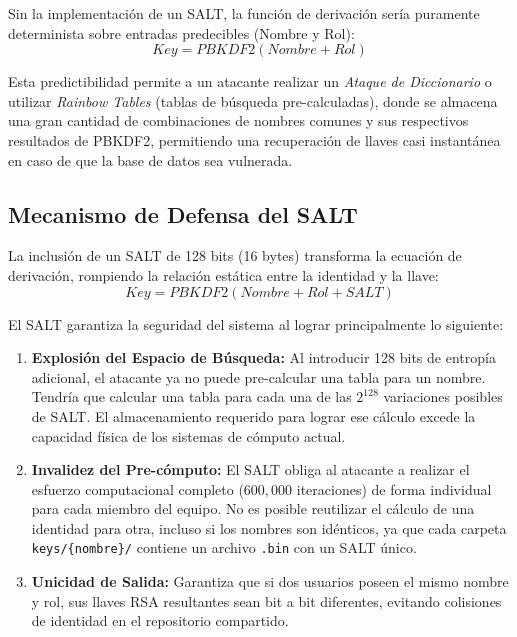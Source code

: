 \documentclass{article}
\begin{document}
Sin la implementación de un SALT, la función de derivación sería puramente determinista sobre entradas predecibles (Nombre y Rol):
\begin{equation}
    Key = PBKDF2(Nombre + Rol)
\end{equation}

Esta predictibilidad permite a un atacante realizar un \textit{Ataque de Diccionario} o utilizar \textit{Rainbow Tables} (tablas de búsqueda pre-calculadas), donde se almacena una gran cantidad de combinaciones de nombres comunes y sus respectivos resultados de PBKDF2, permitiendo una recuperación de llaves casi instantánea en caso de que la base de datos sea vulnerada.

\subsection{Mecanismo de Defensa del SALT}
La inclusión de un SALT de 128 bits (16 bytes) transforma la ecuación de derivación, rompiendo la relación estática entre la identidad y la llave:
\begin{equation}
    Key = PBKDF2(Nombre + Rol + SALT)
\end{equation}

El SALT garantiza la seguridad del sistema al lograr principalmente lo siguiente:

\begin{enumerate}
    \item \textbf{Explosión del Espacio de Búsqueda:} Al introducir 128 bits de entropía adicional, el atacante ya no puede pre-calcular una tabla para un nombre. Tendría que calcular una tabla para cada una de las $2^{128}$ variaciones posibles de SALT. El almacenamiento requerido para lograr ese cálculo excede la capacidad física de los sistemas de cómputo actual.
    
    \item \textbf{Invalidez del Pre-cómputo:} El SALT obliga al atacante a realizar el esfuerzo computacional completo ($600,000$ iteraciones) de forma individual para cada miembro del equipo. No es posible reutilizar el cálculo de una identidad para otra, incluso si los nombres son idénticos, ya que cada carpeta \texttt{keys/\{nombre\}/} contiene un archivo \texttt{.bin} con un SALT único.
    
    \item \textbf{Unicidad de Salida:} Garantiza que si dos usuarios poseen el mismo nombre y rol, sus llaves RSA resultantes sean bit a bit diferentes, evitando colisiones de identidad en el repositorio compartido.
\end{enumerate}
\end{document}
